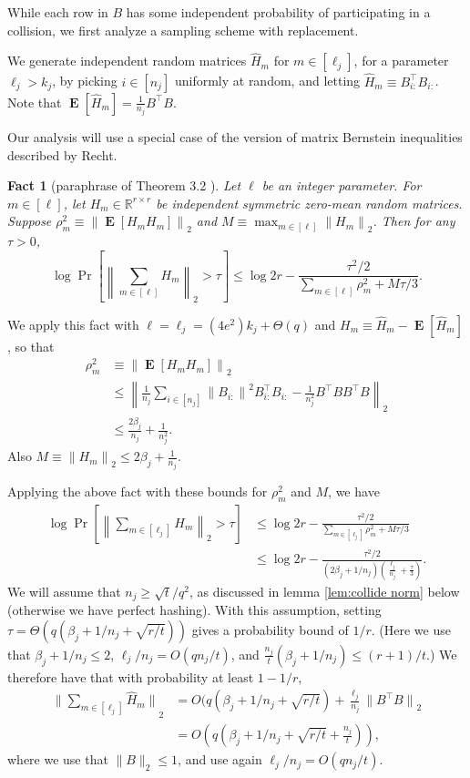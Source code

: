 \documentclass{sig-alternate}
\newcommand{\norm}[1]{{\| #1 \|}}
\DeclareMathOperator{\E}{\mathbf{E}}
\newcommand{\R}{{\mathbb R}}
\newtheorem{fact}[theorem]{Fact}
\begin{document}
While each row in $B$ has some independent probability 
of participating in a collision, we first analyze a sampling scheme with
replacement.

We generate independent
random matrices $\hat{H}_m$ for $m\in [\ell_j]$, for a parameter $\ell_j > k_j$,
by picking $i\in [n_j]$ uniformly at random, and letting
$\hat{H}_m \equiv B_{i:}^\top B_{i:}$. Note that $\E[\hat{H}_m] = \frac{1}{n_j} B^\top B$.






Our analysis will use a special case of the version of matrix Bernstein inequalities
described by Recht.

\begin{fact}[paraphrase of Theorem 3.2 \cite{Recht}]
Let $\ell$ be an integer parameter. 
For $m\in [\ell]$, let $H_m\in\R^{r\times r}$ be independent symmetric zero-mean random matrices.
Suppose
$\rho_m^2 \equiv \norm{\E[H_m H_m]}_2$ and $M\equiv \max_{m\in [\ell]} \norm{H_m}_2$.
Then for any $\tau > 0$,
\[
\log \Pr\left[\left\|\sum_{m\in [\ell]} H_m\right\|_2 > \tau\right]
	\le \log 2r - \frac{\tau^2/2}{\sum_{m \in [\ell]}\rho_m^2 + M\tau/3}.
\]
\end{fact}

We apply this fact with $\ell = \ell_j = (4e^2)k_j + \Theta(q)$ and $H_m \equiv \hat{H}_m - \E[\hat{H}_m]$,
so that
\begin{align*}
\rho_m^2
	 &  \equiv \norm{\E[H_m H_m]}_2
	\\ & \le \left\|
		\frac{1}{n_j} \sum_{i\in [n_j]} \norm{B_{i:}}^2 B_{i:}^\top B_{i:}
		- \frac{1}{n_j^2} B^\top B B^\top B
		\right\|_2
	\\ & \le \frac{2\beta_j}{n_j} + \frac{1}{n_j^2}.
\end{align*}
Also
$M\equiv \norm{H_m}_2 \le 2\beta_j + \frac{1}{n_j}$.

Applying the above fact with these bounds for $\rho_m^2$ and $M$,
we have
\begin{align*}
\log \Pr\left[\left\|\sum_{m\in [\ell_j]} H_m\right\|_2 > \tau\right]
	  & \le \log 2r - \frac{\tau^2/2}{\sum_{m\in [\ell_j]}\rho_m^2 + M\tau/3}
	\\ & \le \log 2r -  \frac{\tau^2/2}{(2\beta_j + 1/n_j)\left(\frac{\ell_j}{n_j} + \frac{\tau}{3}\right)}.
\end{align*}
We will assume that $n_j \ge \sqrt{t}/q^2$, as discussed in lemma \ref{lem:collide norm} 
below (otherwise we have perfect hashing). With this
assumption, setting $\tau = \Theta(q(\beta_j + 1/n_j + \sqrt{r/t}))$ gives
a probability bound of $1/r$.
(Here we use that $\beta_j+1/n_j\le 2$, $\ell_j/n_j = O(q n_j/t)$, and
$\frac{n_j}{t}(\beta_j + 1/n_j) \le (r+1)/t$.)
We therefore have that with probability at least $1-1/r$,
\begin{align*}
\norm{\sum_{m\in [\ell_j]} \hat{H}_m}_2
	& = O(q(\beta_j + 1/n_j + \sqrt{r/t}) + \frac{\ell_j}{n_j}\norm{B^\top B}_2
	\\ & = O(q(\beta_j + 1/n_j + \sqrt{r/t}+ \frac{n_j}{t})),
\end{align*}
where we use that
	$\|B\|_2 \leq 1$, and use again
	$\ell_j/n_j = O(qn_j/t)$.
\end{document}
